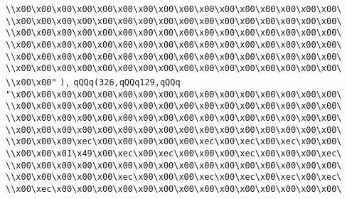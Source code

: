 \verb|\\x00\x00\x00\x00\x00\x00\x00\x00\x00\x00\x00\x00\x00\x00\x00\x00\|\newline
\verb|\\x00\x00\x00\x00\x00\x00\x00\x00\x00\x00\x00\x00\x00\x00\x00\x00\|\newline
\verb|\\x00\x00\x00\x00\x00\x00\x00\x00\x00\x00\x00\x00\x00\x00\x00\x00\|\newline
\verb|\\x00\x00\x00\x00\x00\x00\x00\x00\x00\x00\x00\x00\x00\x00\x00\x00\|\newline
\verb|\\x00\x00\x00\x00\x00\x00\x00\x00\x00\x00\x00\x00\x00\x00\x00\x00\|\newline
\verb|\\x00\x00\x00\x00\x00\x00\x00\x00\x00\x00\x00\x00\x00\x00\x00\x00\|\newline
\verb|\\x00\x00"|\newline
\verb|),|\newline
\verb|qQQq(326,qQQq129,qQQq|\newline
\verb|"\x00\x00\x00\x00\x00\x00\x00\x00\x00\x00\x00\x00\x00\x00\x00\x00\|\newline
\verb|\\x00\x00\x00\x00\x00\x00\x00\x00\x00\x00\x00\x00\x00\x00\x00\x00\|\newline
\verb|\\x00\x00\x00\x00\x00\x00\x00\x00\x00\x00\x00\x00\x00\x00\x00\x00\|\newline
\verb|\\x00\x00\x00\x00\x00\x00\x00\x00\x00\x00\x00\x00\x00\x00\x00\x00\|\newline
\verb|\\x00\x00\x00\xec\x00\x00\x00\x00\x00\xec\x00\xec\x00\xec\x00\x00\|\newline
\verb|\\x00\x00\x01\x49\x00\xec\x00\xec\x00\x00\x00\xec\x00\x00\x00\xec\|\newline
\verb|\\x00\x00\x00\x00\x00\x00\x00\x00\x00\x00\x00\x00\x00\x00\x00\x00\|\newline
\verb|\\x00\x00\x00\x00\x00\xec\x00\x00\x00\xec\x00\xec\x00\xec\x00\xec\|\newline
\verb|\\x00\xec\x00\x00\x00\x00\x00\x00\x00\x00\x00\x00\x00\x00\x00\x00\|\newline
